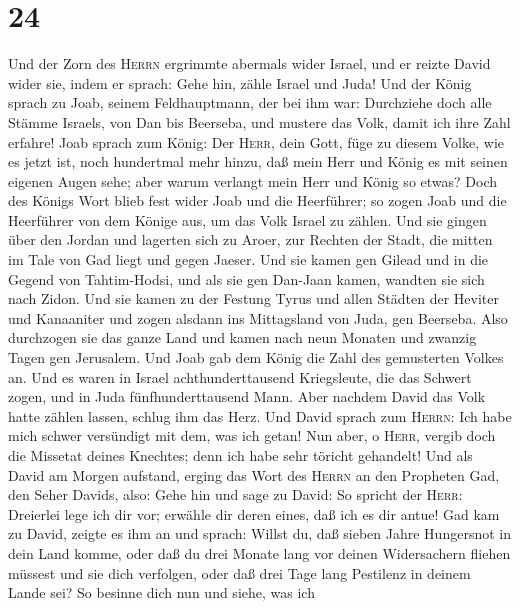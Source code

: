 \hypertarget{section-23}{%
\section{24}\label{section-23}}

 Und der Zorn des \textsc{Herrn} ergrimmte abermals wider
Israel, und er reizte David wider sie, indem er sprach: Gehe hin, zähle
Israel und Juda!  Und der König sprach zu Joab, seinem
Feldhauptmann, der bei ihm war: Durchziehe doch alle Stämme Israels, von
Dan bis Beerseba, und mustere das Volk, damit ich ihre Zahl erfahre!
 Joab sprach zum König: Der \textsc{Herr}, dein Gott, füge
zu diesem Volke, wie es jetzt ist, noch hundertmal mehr hinzu, daß mein
Herr und König es mit seinen eigenen Augen sehe; aber warum verlangt
mein Herr und König so etwas?  Doch des Königs Wort blieb
fest wider Joab und die Heerführer; so zogen Joab und die Heerführer von
dem Könige aus, um das Volk Israel zu zählen.  Und sie
gingen über den Jordan und lagerten sich zu Aroer, zur Rechten der
Stadt, die mitten im Tale von Gad liegt und gegen Jaeser. 
Und sie kamen gen Gilead und in die Gegend von Tahtim-Hodsi, und als sie
gen Dan-Jaan kamen, wandten sie sich nach Zidon.  Und sie
kamen zu der Festung Tyrus und allen Städten der Heviter und Kanaaniter
und zogen alsdann ins Mittagsland von Juda, gen Beerseba. 
Also durchzogen sie das ganze Land und kamen nach neun Monaten und
zwanzig Tagen gen Jerusalem.  Und Joab gab dem König die
Zahl des gemusterten Volkes an. Und es waren in Israel
achthunderttausend Kriegsleute, die das Schwert zogen, und in Juda
fünfhunderttausend Mann.  Aber nachdem David das Volk
hatte zählen lassen, schlug ihm das Herz. Und David sprach zum
\textsc{Herrn}: Ich habe mich schwer versündigt mit dem, was ich getan!
Nun aber, o \textsc{Herr}, vergib doch die Missetat deines Knechtes;
denn ich habe sehr töricht gehandelt!  Und als David am
Morgen aufstand, erging das Wort des \textsc{Herrn} an den Propheten
Gad, den Seher Davids, also:  Gehe hin und sage zu David:
So spricht der \textsc{Herr}: Dreierlei lege ich dir vor; erwähle dir
deren eines, daß ich es dir antue!  Gad kam zu David,
zeigte es ihm an und sprach: Willst du, daß sieben Jahre Hungersnot in
dein Land komme, oder daß du drei Monate lang vor deinen Widersachern
fliehen müssest und sie dich verfolgen, oder daß drei Tage lang
Pestilenz in deinem Lande sei? So besinne dich nun und siehe, was ich
